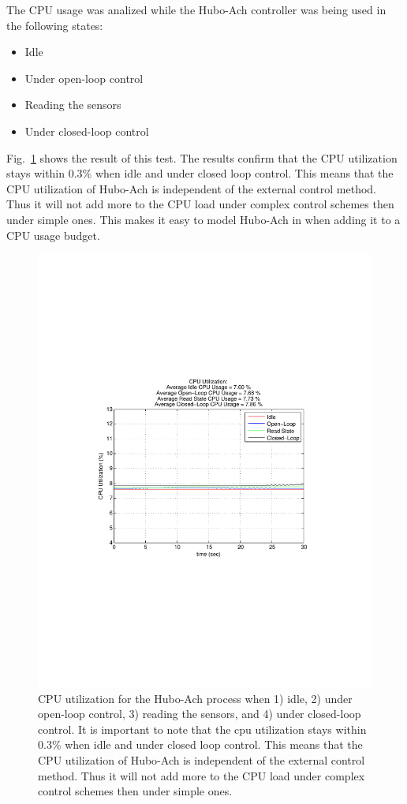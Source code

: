 The CPU usage was analized while the Hubo-Ach controller was being used in the following states:
\begin{itemize}
\item Idle
\item Under open-loop control
\item Reading the sensors
\item Under closed-loop control
\end{itemize}

Fig.~\ref{fig:timing-getTrigger} shows the result of this test.
The results confirm that the CPU utilization stays within 0.3\% when idle and under closed loop control.
This means that the CPU utilization of Hubo-Ach is independent of the external control method.
Thus it will not add more to the CPU load under complex control schemes then under simple ones.
This makes it easy to model Hubo-Ach in when adding it to a CPU usage budget.


\begin{figure}[thpb]
  \centering
\includegraphics[width=0.6\columnwidth]{./timingData/cpu.pdf}
  \caption{CPU utilization for the Hubo-Ach process when 1) idle, 2) under open-loop control, 3) reading the sensors, and 4) under closed-loop control.  
It is important to note that the cpu utilization stays within 0.3\% when idle and under closed loop control.
This means that the CPU utilization of Hubo-Ach is independent of the external control method.
Thus it will not add more to the CPU load under complex control schemes then under simple ones.}
  \label{fig:timing-getTrigger}
\end{figure}
